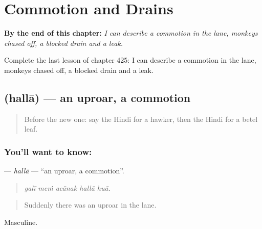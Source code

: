 
\chapter{Commotion and Drains}
\label{ch:hi-commotion-and-drains}

\begin{chapteropening}
\textbf{By the end of this chapter:} \emph{I can describe a commotion in the lane, monkeys chased off, a blocked drain and a leak.}

Complete the last lesson of chapter 425: I can describe a commotion in the lane, monkeys chased off, a blocked drain and a leak.
\end{chapteropening}

\section[\texorpdfstring{\hi{हल्ला} (hallā)}{हल्ला (hallā)}]{ (hallā) — an uproar, a commotion}

\label{lesson:HI-C425-halla}



\begin{quote}
Before the new one: say the Hindi for a hawker, then the Hindi for a betel leaf.
\end{quote}

\subsection*{You'll want to know: }
\textbf{} — \emph{hallā} — \textquotedblleft{}an uproar, a commotion\textquotedblright{}.

\begin{quote}
    
\end{quote}

\begin{quote}
\emph{galī meṁ acānak hallā huā.}
\end{quote}

\begin{quote}
Suddenly there was an uproar in the lane.
\end{quote}

Masculine.

